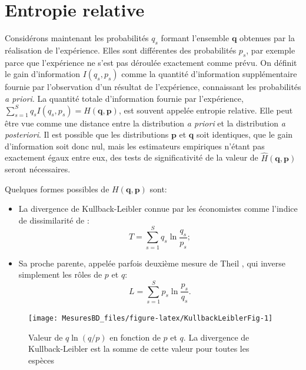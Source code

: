 \documentclass[
  11pt,
  french,
  a4paper,
  extrafontsizes,onecolumn,openright
  ]{memoir}
\providecommand{\tightlist}{%
  \setlength{\itemsep}{0pt}\setlength{\parskip}{0pt}}
\begin{document}
\hypertarget{entropie-relative}{%
\section{Entropie relative}\label{entropie-relative}}

Considérons maintenant les probabilités \(q_s\) formant l'ensemble \(\mathbf{q}\) obtenues par la réalisation de l'expérience.
Elles sont différentes des probabilités \(p_s\), par exemple parce que l'expérience ne s'est pas déroulée exactement comme prévu.
On définit le gain d'information \(I(q_s,p_s)\) comme la quantité d'information supplémentaire fournie par l'observation d'un résultat de l'expérience, connaissant les probabilités \emph{a priori}.
La quantité totale d'information fournie par l'expérience, \(\sum^S_{s=1}{q_sI(q_s,p_s)}=H(\mathbf{q},\mathbf{p})\), est souvent appelée entropie relative.
Elle peut être vue comme une distance entre la distribution \emph{a priori} et la distribution \emph{a posteriori}.
Il est possible que les distributions \(\mathbf{p}\) et \(\mathbf{q}\) soit identiques, que le gain d'information soit donc nul, mais les estimateurs empiriques n'étant pas exactement égaux entre eux, des tests de significativité de la valeur de \(\hat{H}(\mathbf{q},\mathbf{p})\) seront nécessaires.

Quelques formes possibles de \(H(\mathbf{q},\mathbf{p})\) sont:

\begin{itemize}
\tightlist
\item
  La divergence de Kullback-Leibler \autocite{Kullback1951} connue par les économistes comme l'indice de dissimilarité de \textcite{Theil1967}:
  \begin{equation}
  \label{eq:Theil}
  T = \sum^S_{s=1}{q_{s}\ln\frac{q_s}{p_s}};
  \end{equation}
\item
  Sa proche parente, appelée parfois deuxième mesure de Theil \autocite{Conceicao2000}, qui inverse simplement les rôles de \(p\) et \(q\):
  \begin{equation}
  \label{eq:Theil2}
  L = \sum^S_{s=1}{p_{s}\ln\frac{p_s}{q_s}}.
  \end{equation}
\end{itemize}



\scriptsize

\begin{figure}

{\centering \texttt{[image: MesuresBD\_files/figure-latex/KullbackLeiblerFig-1]} 

}

\caption{Valeur de \(q\ln(q/p)\) en fonction de \(p\) et \(q\). La divergence de Kullback-Leibler est la somme de cette valeur pour toutes les espèces}\label{fig:KullbackLeiblerFig}
\end{figure}
\end{document}
